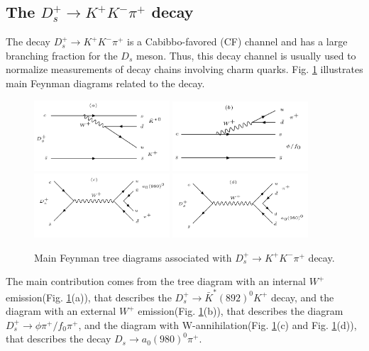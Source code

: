 \subsection{The $D_{s}^{+} \rightarrow K^{+}K^{-}\pi^{+}$ decay}
\par{

    The decay $D_{s}^{+} \rightarrow K^{+}K^{-}\pi^{+}$ is a Cabibbo-favored (CF) channel and has a large branching fraction for the $D_{s}$ meson.
    Thus, this decay channel is usually used to normalize measurements of decay chains involving charm quarks.
    Fig. \ref{Feynman-dia} illustrates main Feynman diagrams related to the decay.
    \begin{figure}[h]
        \centering
        \includegraphics[width=0.45\textwidth]{plot/Fa.PNG}
        \includegraphics[width=0.45\textwidth]{plot/Fb.PNG}
        \includegraphics[width=0.45\textwidth]{plot/Fc.PNG}
        \includegraphics[width=0.45\textwidth]{plot/Fd.PNG}
        \caption{Main Feynman tree diagrams associated with $D_{s}^{+} \rightarrow K^{+}K^{-}\pi^{+}$ decay.}
        \label{Feynman-dia}
    \end{figure}
    The main contribution comes from the tree diagram with an internal $W^{+}$ emission(Fig. \ref{Feynman-dia}(a)), that describes the $D_{s}^{+} \rightarrow \bar{K}^{*}(892)^{0}K^{+}$ decay, 
    and the diagram with an external $W^{+}$ emission(Fig. \ref{Feynman-dia}(b)), that describes the diagram $D_{s}^{+} \rightarrow \phi\pi^{+}/ f_{0}\pi^{+}$, 
    and the diagram with W-annihilation(Fig. \ref{Feynman-dia}(c) and Fig. \ref{Feynman-dia}(d)), that describes the decay $D_{s} \rightarrow a_{0}(980)^{0}\pi^{+}$.
}
    
